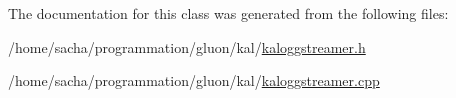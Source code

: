 The documentation for this class was generated from the following files:\begin{CompactItemize}
\item 
/home/sacha/programmation/gluon/kal/\hyperlink{kaloggstreamer_8h}{kaloggstreamer.h}\item 
/home/sacha/programmation/gluon/kal/\hyperlink{kaloggstreamer_8cpp}{kaloggstreamer.cpp}\end{CompactItemize}
